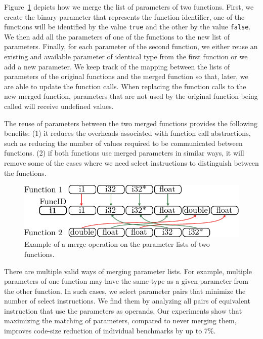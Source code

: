 Figure~\ref{fig:merged-params} depicts
how we merge the list of parameters of two functions.
First, we create the binary parameter that represents the function identifier,
one of the functions will be identified by the value \texttt{true} and the other
by the value \texttt{false}.
We then add all the parameters of one of the functions to the new list of
parameters.
Finally, for each parameter of the second function, we either reuse an existing
and available parameter of identical type from the first function or we add a
new parameter.
We keep track of the mapping between the lists of parameters of the
original functions and the merged function so that, later, we are able to
update the function calls.
When replacing the function calls to the new merged function, parameters that
are not used by the original function being called will receive undefined values.

The reuse of parameters between the two merged functions provides the following
benefits:
(1) it reduces the overheads associated with function call abstractions, such as
reducing the number of values required to be communicated between functions.
(2) if both functions use merged parameters in similar ways, it will remove some
of the cases where we need select instructions to distinguish between the functions.

\begin{figure}[t!]
  \centering
  \includegraphics[width=0.9\linewidth]{src/merge-operation/figs/merged-params}
  \caption{Example of a merge operation on the parameter lists of two functions.}
  \label{fig:merged-params}
\end{figure}

There are multiple valid ways of merging parameter lists. For example, multiple
parameters of one function may have the same type as a given parameter from the other
function. In such cases, we select parameter pairs that minimize the number of
select instructions. We find them by analyzing all pairs of equivalent instruction
that use the parameters as operands. 
Our experiments show that maximizing the matching of parameters, compared to never
merging them, improves code-size reduction of individual benchmarks by up to 7\%.

